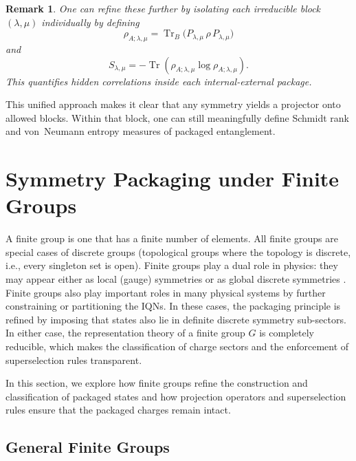 \documentclass[12pt,a4paper]{article}
\newtheorem{remark}{Remark}
\begin{document}
\begin{remark}
	One can refine these further by isolating each irreducible block $(\lambda,\mu)$ individually by defining
	$$
	\rho_{A;\lambda,\mu}=\operatorname{Tr}_B\bigl(P_{\lambda,\mu}\,\rho\,P_{\lambda,\mu}\bigr)
	$$
	and
	$$
	S_{\lambda,\mu}=-\operatorname{Tr}(\rho_{A;\lambda,\mu}\log\rho_{A;\lambda,\mu}).
	$$
	This quantifies hidden correlations inside each internal-external package.
\end{remark}


This unified approach makes it clear that any symmetry yields a projector onto allowed blocks.
Within that block, one can still meaningfully define Schmidt rank and von Neumann entropy measures of packaged entanglement.






\section{Symmetry Packaging under Finite Groups}
\label{SEC:SymmetryPackagingOnFiniteGroups}


A finite group \cite{Artin2014,Serre1977} is one that has a finite number of elements.
All finite groups are special cases of discrete groups (topological groups where the topology is discrete, i.e., every singleton set is open).
Finite groups play a dual role in physics:
they may appear either as local (gauge) symmetries or as global discrete symmetries \cite{Wegner1971,Hooft1978,DijkgraafWitten1990}.
Finite groups also play important roles in many physical systems \cite{Landau1957,Wigner1959} by further constraining or partitioning the IQNs.
In these cases, the packaging principle is refined by imposing that states also lie in definite discrete symmetry sub-sectors.
In either case, the representation theory of a finite group $G$ is completely reducible, which makes the classification of charge sectors and the enforcement of superselection rules transparent.


In this section, we explore how finite groups refine the construction and classification of packaged states and how projection operators \cite{Hellinger1909,ReedSimon1972,Conway2007} and superselection rules ensure that the packaged charges remain intact.



\subsection{General Finite Groups}
\label{SEC:GeneralFiniteGroups}
\end{document}
